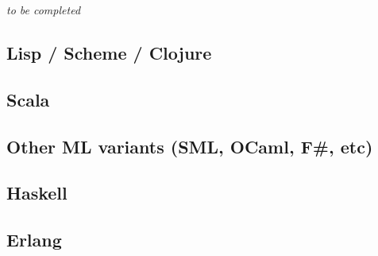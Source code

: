 \emph{to be completed}

\subsection{Lisp / Scheme / Clojure}
\subsection{Scala}
\subsection{Other ML variants (SML, OCaml, F\#, etc)}
\subsection{Haskell}
\subsection{Erlang}